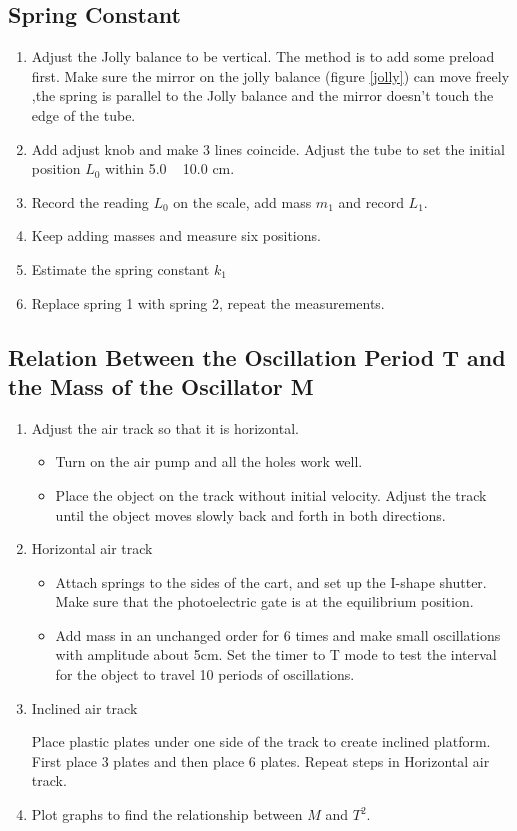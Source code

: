 \documentclass[11pt,a4paper]{article}
\begin{document}
\subsection{Spring Constant}
\begin{enumerate}[1.]
    \item  Adjust the Jolly balance to be vertical. The method is to add some preload first. Make sure the mirror on the jolly balance (figure \ref{jolly}) can move freely ,the spring is parallel to the Jolly balance and the mirror doesn't touch the edge of the tube.
    \item Add adjust knob and make 3 lines coincide. Adjust the tube to set the initial position $L_0$ within 5.0 ~ 10.0 cm.
    \item Record the reading $L_0$ on the scale, add mass $m_1$ and record $L_1$.
    \item Keep adding masses and measure six positions.
    \item Estimate the spring constant $k_1$
    \item Replace spring 1 with spring 2, repeat the measurements.
\end{enumerate}
\subsection{Relation Between the Oscillation Period T and the Mass of the Oscillator M}
\begin{enumerate}[1.]
    \item Adjust the air track so that it is horizontal.
        \begin{itemize}
            \item [\romannumeral 1] Turn on the air pump and all the holes work well.
            \item [\romannumeral 2] Place the object on the track without initial velocity. Adjust the track until the object moves slowly back and forth in both directions.
        \end{itemize}
    \item Horizontal air track
        \begin{itemize}
            \item [\romannumeral 1]  Attach springs to the sides of the cart, and set up the I-shape shutter. Make sure
            that the photoelectric gate is at the equilibrium position.
            \item[\romannumeral 2]  Add mass in an unchanged order for 6 times and make small oscillations with amplitude
            about 5cm. Set the timer to T mode to test the interval for the object to travel 10 periods of
            oscillations.
        \end{itemize}
    \item Inclined air track\par
    Place plastic plates under one side of the track to create inclined platform. First place 3 plates and then place 6 plates. Repeat steps in Horizontal air track.
        \item Plot graphs to find the relationship between $M$ and $T^2$.
\end{enumerate}
\newpage
\end{document}
